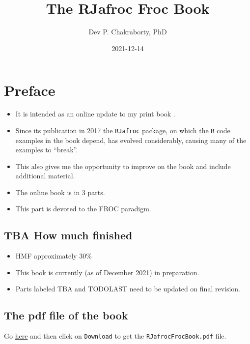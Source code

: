 \documentclass[
]{book}
\title{The RJafroc Froc Book}
\author{Dev P. Chakraborty, PhD}
\date{2021-12-14}
\providecommand{\tightlist}{%
  \setlength{\itemsep}{0pt}\setlength{\parskip}{0pt}}
\begin{document}
\maketitle

{
\setcounter{tocdepth}{1}
\tableofcontents
}
\hypertarget{preface}{%
\chapter*{Preface}\label{preface}}

\begin{itemize}
\tightlist
\item
  It is intended as an online update to my print book \citep{chakraborty2017observer}.
\item
  Since its publication in 2017 the \texttt{RJafroc} package, on which the \texttt{R} code examples in the book depend, has evolved considerably, causing many of the examples to ``break''.
\item
  This also gives me the opportunity to improve on the book and include additional material.
\item
  The online book is in 3 parts.
\item
  This part is devoted to the FROC paradigm.
\end{itemize}

\hypertarget{tba-how-much-finished}{%
\section*{TBA How much finished}\label{tba-how-much-finished}}

\begin{itemize}
\tightlist
\item
  HMF approximately 30\%
\item
  This book is currently (as of December 2021) in preparation.
\item
  Parts labeled TBA and TODOLAST need to be updated on final revision.
\end{itemize}

\hypertarget{the-pdf-file-of-the-book}{%
\section*{The pdf file of the book}\label{the-pdf-file-of-the-book}}

Go \href{https://github.com/dpc10ster/RJafrocFrocBook/blob/gh-pages/RJafrocFrocBook.pdf}{here} and then click on \texttt{Download} to get the \texttt{RJafrocFrocBook.pdf} file.
\end{document}
